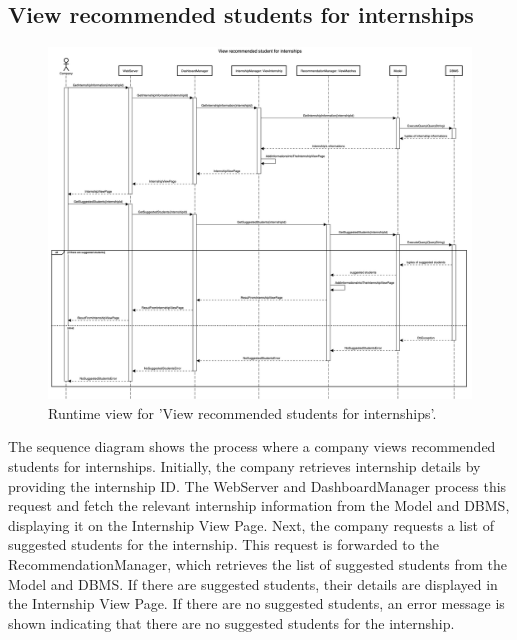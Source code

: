 \subsection{View recommended students for internships}
\begin{figure}[H]
    \begin{center}
        \includegraphics[width=0.8\linewidth]{DD/LaTeX/Images/RuntimeView/ViewRecommendedStudenst.png}
        \caption{Runtime view for 'View recommended students for internships'.}
        \label{fig:runtime_ViewRecommendedStudenst}%
    \end{center}
\end{figure}

The sequence diagram shows the process where a company views recommended students for internships. Initially, the company retrieves internship details by providing the internship ID. The WebServer and DashboardManager process this request and fetch the relevant internship information from the Model and DBMS, displaying it on the Internship View Page. Next, the company requests a list of suggested students for the internship. This request is forwarded to the RecommendationManager, which retrieves the list of suggested students from the Model and DBMS. If there are suggested students, their details are displayed in the Internship View Page. If there are no suggested students, an error message is shown indicating that there are no suggested students for the internship.

